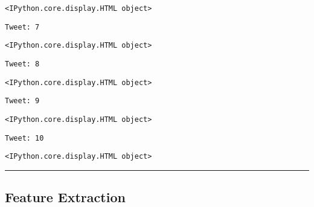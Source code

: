 \documentclass[11pt]{article}
\begin{document}
    
    \begin{Verbatim}[commandchars=\\\{\}]
<IPython.core.display.HTML object>
    \end{Verbatim}

    
    \begin{Verbatim}[commandchars=\\\{\}]
Tweet: 7
    \end{Verbatim}

    
    \begin{Verbatim}[commandchars=\\\{\}]
<IPython.core.display.HTML object>
    \end{Verbatim}

    
    \begin{Verbatim}[commandchars=\\\{\}]
Tweet: 8
    \end{Verbatim}

    
    \begin{Verbatim}[commandchars=\\\{\}]
<IPython.core.display.HTML object>
    \end{Verbatim}

    
    \begin{Verbatim}[commandchars=\\\{\}]
Tweet: 9
    \end{Verbatim}

    
    \begin{Verbatim}[commandchars=\\\{\}]
<IPython.core.display.HTML object>
    \end{Verbatim}

    
    \begin{Verbatim}[commandchars=\\\{\}]
Tweet: 10
    \end{Verbatim}

    
    \begin{Verbatim}[commandchars=\\\{\}]
<IPython.core.display.HTML object>
    \end{Verbatim}

    
    \begin{center}\rule{0.5\linewidth}{0.5pt}\end{center}

    \hypertarget{feature-extraction}{%
\subsection{Feature Extraction}\label{feature-extraction}}
\end{document}
